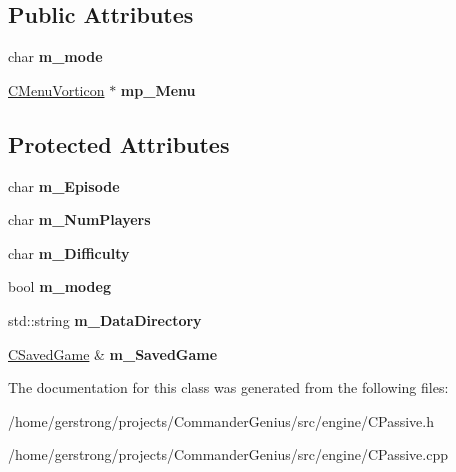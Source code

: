 \subsection*{Public Attributes}
\begin{DoxyCompactItemize}
\item 
\hypertarget{class_c_passive_a5a2012bf164a7828ded95f3c0156dfb0}{
char {\bfseries m\_\-mode}}
\label{class_c_passive_a5a2012bf164a7828ded95f3c0156dfb0}

\item 
\hypertarget{class_c_passive_a1a403c43d16225fb5d9aa30b54d736ab}{
\hyperlink{class_c_menu_vorticon}{CMenuVorticon} $\ast$ {\bfseries mp\_\-Menu}}
\label{class_c_passive_a1a403c43d16225fb5d9aa30b54d736ab}

\end{DoxyCompactItemize}
\subsection*{Protected Attributes}
\begin{DoxyCompactItemize}
\item 
\hypertarget{class_c_passive_ac34fa09a7da33166d725924dbe6f867c}{
char {\bfseries m\_\-Episode}}
\label{class_c_passive_ac34fa09a7da33166d725924dbe6f867c}

\item 
\hypertarget{class_c_passive_af3d21feb911a94cead8faac6e4b159e9}{
char {\bfseries m\_\-NumPlayers}}
\label{class_c_passive_af3d21feb911a94cead8faac6e4b159e9}

\item 
\hypertarget{class_c_passive_a3c6e74921746446f6a4a6871ac79b712}{
char {\bfseries m\_\-Difficulty}}
\label{class_c_passive_a3c6e74921746446f6a4a6871ac79b712}

\item 
\hypertarget{class_c_passive_a1058c056080f8ee0057a5002cc26f153}{
bool {\bfseries m\_\-modeg}}
\label{class_c_passive_a1058c056080f8ee0057a5002cc26f153}

\item 
\hypertarget{class_c_passive_a508bf888a06f09c113b4b70b2497f837}{
std::string {\bfseries m\_\-DataDirectory}}
\label{class_c_passive_a508bf888a06f09c113b4b70b2497f837}

\item 
\hypertarget{class_c_passive_a8077515910c8d60347bf5decdfaf4acb}{
\hyperlink{class_c_saved_game}{CSavedGame} \& {\bfseries m\_\-SavedGame}}
\label{class_c_passive_a8077515910c8d60347bf5decdfaf4acb}

\end{DoxyCompactItemize}


The documentation for this class was generated from the following files:\begin{DoxyCompactItemize}
\item 
/home/gerstrong/projects/CommanderGenius/src/engine/CPassive.h\item 
/home/gerstrong/projects/CommanderGenius/src/engine/CPassive.cpp\end{DoxyCompactItemize}
